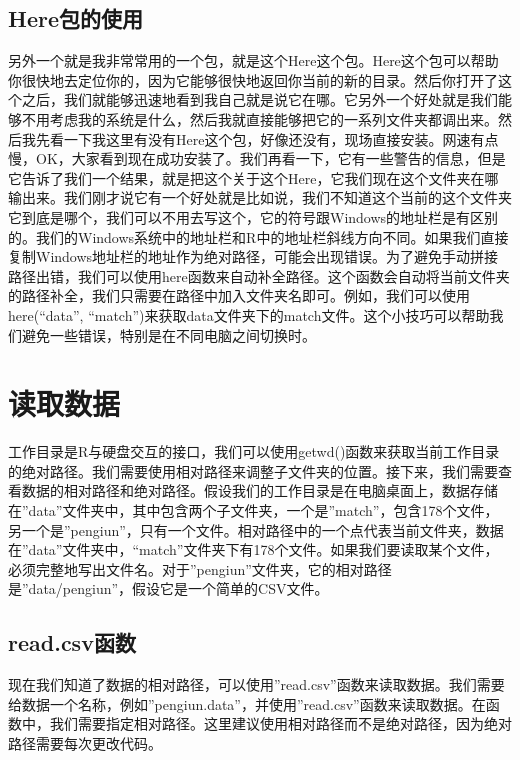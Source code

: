 \documentclass[
  oneside]{book}
\begin{document}
\hypertarget{hereux5305ux7684ux4f7fux7528}{%
\subsection{Here包的使用}\label{hereux5305ux7684ux4f7fux7528}}

另外一个就是我非常常用的一个包，就是这个Here这个包。Here这个包可以帮助你很快地去定位你的，因为它能够很快地返回你当前的新的目录。然后你打开了这个之后，我们就能够迅速地看到我自己就是说它在哪。它另外一个好处就是我们能够不用考虑我的系统是什么，然后我就直接能够把它的一系列文件夹都调出来。然后我先看一下我这里有没有Here这个包，好像还没有，现场直接安装。网速有点慢，OK，大家看到现在成功安装了。我们再看一下，它有一些警告的信息，但是它告诉了我们一个结果，就是把这个关于这个Here，它我们现在这个文件夹在哪输出来。我们刚才说它有一个好处就是比如说，我们不知道这个当前的这个文件夹它到底是哪个，我们可以不用去写这个，它的符号跟Windows的地址栏是有区别的。我们的Windows系统中的地址栏和R中的地址栏斜线方向不同。如果我们直接复制Windows地址栏的地址作为绝对路径，可能会出现错误。为了避免手动拼接路径出错，我们可以使用here函数来自动补全路径。这个函数会自动将当前文件夹的路径补全，我们只需要在路径中加入文件夹名即可。例如，我们可以使用here(``data'', ``match'')来获取data文件夹下的match文件。这个小技巧可以帮助我们避免一些错误，特别是在不同电脑之间切换时。

\hypertarget{ux8bfbux53d6ux6570ux636e}{%
\section{读取数据}\label{ux8bfbux53d6ux6570ux636e}}

工作目录是R与硬盘交互的接口，我们可以使用getwd()函数来获取当前工作目录的绝对路径。我们需要使用相对路径来调整子文件夹的位置。接下来，我们需要查看数据的相对路径和绝对路径。假设我们的工作目录是在电脑桌面上，数据存储在''data''文件夹中，其中包含两个子文件夹，一个是''match''，包含178个文件，另一个是''pengiun''，只有一个文件。相对路径中的一个点代表当前文件夹，数据在''data''文件夹中，``match''文件夹下有178个文件。如果我们要读取某个文件，必须完整地写出文件名。对于''pengiun''文件夹，它的相对路径是''data/pengiun''，假设它是一个简单的CSV文件。

\hypertarget{read.csvux51fdux6570}{%
\subsection{read.csv函数}\label{read.csvux51fdux6570}}

现在我们知道了数据的相对路径，可以使用''read.csv''函数来读取数据。我们需要给数据一个名称，例如''pengiun.data''，并使用''read.csv''函数来读取数据。在函数中，我们需要指定相对路径。这里建议使用相对路径而不是绝对路径，因为绝对路径需要每次更改代码。
\end{document}
